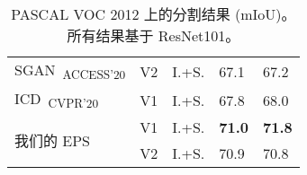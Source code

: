 \begin{table}[]
{\begin{tabular}{@{}lccll@{}}
\multicolumn{1}{l}{SGAN~\cite{yao2020saliency}\textsubscript{ACCESS'20}}                & V2        & I.+S. & 67.1                    & 67.2                     \\
\multicolumn{1}{l}{ICD~\cite{fan2020learning}\textsubscript{CVPR'20}}                   & V1        & I.+S. & 67.8                    & 68.0                     \\ \midrule
\multicolumn{1}{l}{\multirow{2}{*}{我们的 EPS}}                                            & V1        & I.+S. & \textbf{71.0}           & \textbf{71.8}            \\
\multicolumn{1}{l}{}                                                                    & V2        & I.+S. & 70.9                    & 70.8                     \\ \bottomrule
\end{tabular}
}
\vspace{2mm}
\caption{PASCAL VOC 2012 上的分割结果 (mIoU)。所有结果基于 ResNet101。}\vspace{-2mm}
\label{tab:seg_quan_voc_resnet101}
\end{table}
